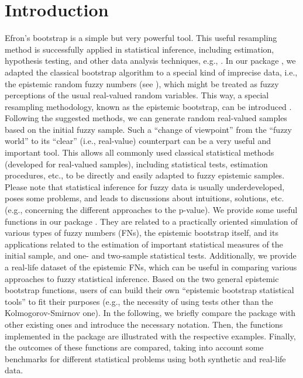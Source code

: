 \section{Introduction} 
\label{intro}
Efron's bootstrap \citep{EfroTibs93} is a simple but very powerful tool. This useful resampling method is successfully applied in statistical inference, including estimation, hypothesis testing, and other data analysis techniques, e.g., \cite{davison_hinkley_1997,ISLR,romaniuk2019}.
In our package , we adapted the classical bootstrap algorithm to a special kind of imprecise data, i.e., the epistemic random fuzzy numbers (see \cite{Couso2014}), which might be treated as fuzzy perceptions of the usual real-valued random variables.
This way, a special resampling methodology, known as the epistemic bootstrap, can be introduced \citep{grzegorzewski2021,10.1007/978-3-031-08974-9_39,pgmr2022}.
Following the suggested methods, we can generate random real-valued samples based on the initial fuzzy sample.
Such a ``change of viewpoint'' from the ``fuzzy world'' to its ``clear'' (i.e., real-value) counterpart can be a very useful and important tool.
This allows all commonly used classical statistical methods (developed for real-valued samples), including statistical tests, estimation procedures, etc., to be directly and easily adapted to fuzzy epistemic samples.
Please note that statistical inference for fuzzy data is usually underdeveloped, poses some problems, and leads to discussions about intuitions, solutions, etc. (e.g., concerning the different approaches to the p-value).
We provide some useful functions in our package .
They are related to a practically oriented simulation of various types of fuzzy numbers (FNs), the epistemic bootstrap itself, and its applications related to the estimation of important statistical measures of the initial sample, and one- and two-sample statistical tests.
Additionally, we provide a real-life dataset of the epistemic FNs, which can be useful in comparing various approaches to fuzzy statistical inference.
Based on the two general epistemic bootstrap functions, users of  can build their own ``epistemic bootstrap statistical tools'' to fit their purposes (e.g., the necessity of using tests other than the Kolmogorov-Smirnov one).
In the following, we briefly compare the  package with other existing ones and introduce the necessary notation.
Then, the functions implemented in the package are illustrated with the respective examples.
Finally, the outcomes of these functions are compared, taking into account some benchmarks for different statistical problems using both synthetic and real-life data. 
